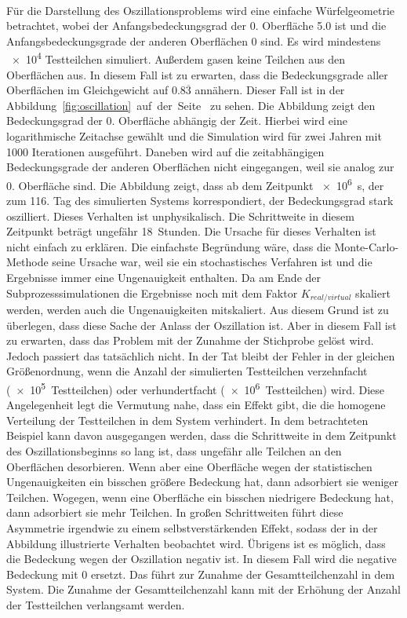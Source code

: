 \documentclass{listhesis}
\begin{document}
\paragraph{}
Für die Darstellung des Oszillationsproblems wird eine einfache Würfelgeometrie betrachtet, wobei der Anfangsbedeckungsgrad der 0. Oberfläche 5.0 ist und die Anfangsbedeckungsgrade der anderen Oberflächen 0 sind. Es wird mindestens \SI{e4}{} Testteilchen simuliert. Außerdem gasen keine Teilchen aus den Oberflächen aus. In diesem Fall ist zu erwarten, dass die Bedeckungsgrade aller Oberflächen im Gleichgewicht auf $0.8\overline{3}$ annähern. Dieser Fall ist in der Abbildung~\ref{fig:oscillation}~auf~der~Seite~\pageref{fig:oscillation} zu sehen. Die Abbildung zeigt den Bedeckungsgrad der 0. Oberfläche abhängig der Zeit. Hierbei wird eine logarithmische Zeitachse gewählt und die Simulation wird für zwei Jahren mit 1000 Iterationen ausgeführt. Daneben wird auf die zeitabhängigen Bedeckungsgrade der anderen Oberflächen nicht eingegangen, weil sie analog zur 0. Oberfläche sind. Die Abbildung zeigt, dass ab dem Zeitpunkt \SI{e6}{\s}, der zum 116. Tag des simulierten Systems korrespondiert, der Bedeckungsgrad stark oszilliert. Dieses Verhalten ist unphysikalisch. Die Schrittweite in diesem Zeitpunkt beträgt ungefähr \SI{18}{Stunden}. Die Ursache für dieses Verhalten ist nicht einfach zu erklären. Die einfachste Begründung wäre, dass die Monte-Carlo-Methode seine Ursache war, weil sie ein stochastisches Verfahren ist und die Ergebnisse immer eine Ungenauigkeit enthalten. Da am Ende der Subprozesssimulationen die Ergebnisse noch mit dem Faktor $K_{real/virtual}$ skaliert werden, werden auch die Ungenauigkeiten mitskaliert. Aus diesem Grund ist zu überlegen, dass diese Sache der Anlass der Oszillation ist. Aber in diesem Fall ist zu erwarten, dass das Problem mit der Zunahme der Stichprobe gelöst wird. Jedoch passiert das tatsächlich nicht. In der Tat bleibt der Fehler in der gleichen Größenordnung, wenn die Anzahl der simulierten Testteilchen verzehnfacht (\SI{e5} {Testteilchen}) oder verhundertfacht (\SI{e6}{Testteilchen}) wird. Diese Angelegenheit legt die Vermutung nahe, dass ein Effekt gibt, die die homogene Verteilung der Testteilchen in dem System verhindert. In dem betrachteten Beispiel kann davon ausgegangen werden, dass die Schrittweite in dem Zeitpunkt des Oszillationsbeginns so lang ist, dass ungefähr alle Teilchen an den Oberflächen desorbieren. Wenn aber eine Oberfläche wegen der statistischen Ungenauigkeiten ein bisschen größere Bedeckung hat, dann adsorbiert sie weniger Teilchen. Wogegen, wenn eine Oberfläche ein bisschen niedrigere Bedeckung hat, dann adsorbiert sie mehr Teilchen. In großen Schrittweiten führt diese Asymmetrie irgendwie zu einem selbstverstärkenden Effekt, sodass der in der Abbildung illustrierte Verhalten beobachtet wird. Übrigens ist es möglich, dass die Bedeckung wegen der Oszillation negativ ist. In diesem Fall wird die negative Bedeckung mit 0 ersetzt. Das führt zur Zunahme der Gesamtteilchenzahl in dem System. Die Zunahme der Gesamtteilchenzahl kann mit der Erhöhung der Anzahl der Testteilchen verlangsamt werden.
\end{document}
